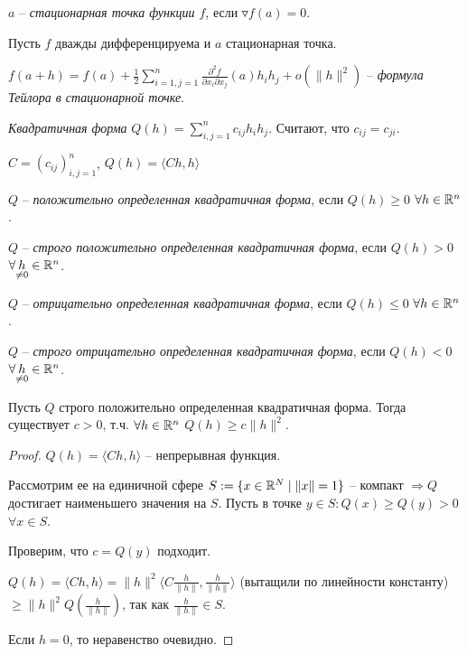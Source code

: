 \begin{definition}
    $a$ – \textit{стационарная точка функции $f$}, если $\triangledown f(a)=0$.
\end{definition}

\begin{remark}
    Пусть $f$ дважды дифференцируема и $a$ стационарная точка.

    $f(a + h)=f(a)+\frac{1}{2}\sum\limits_{i=1, j=1}^n\frac{\partial^2 f}{\partial x_i \partial x_j}(a) h_i h_j+o(\|h\|^2)$ – \textit{формула Тейлора в стационарной точке}.
\end{remark}

\begin{definition}
    \textit{Квадратичная форма} $Q(h)=\sum\limits_{i, j=1}^n c_{ij}h_ih_j$. Считают, что $c_{ij}=c_{ji}$.

    $C= (c_{ij})^n_{i, j=1}$, $Q(h)=\langle Ch, h\rangle$
\end{definition}

\begin{definition}
    $Q$ – \textit{положительно определенная квадратичная форма}, если $Q(h)\geq 0$ $\forall h\in \mathbb{R}^n$.

    $Q$ – \textit{строго положительно определенная квадратичная форма}, если $Q(h)> 0$ $\forall \underset{\neq 0}{h}\in \mathbb{R}^n$.
\end{definition}

\begin{definition}
    $Q$ – \textit{отрицательно определенная квадратичная форма}, если $Q(h)\leq 0$ $\forall h\in \mathbb{R}^n$.

    $Q$ – \textit{строго отрицательно определенная квадратичная форма}, если $Q(h)< 0$ $\forall \underset{\neq 0}{h}\in \mathbb{R}^n$.
\end{definition}

\begin{lemma}
    Пусть $Q$ строго положительно определенная квадратичная форма. Тогда существует $c>0$, т.ч. $ \forall h\in \mathbb{R}^n$ $Q(h)\geq c\|h\|^2$.
\end{lemma}
\begin{proof}
    $Q(h)=\langle Ch, h\rangle$ – непрерывная функция. 
    
    
    Рассмотрим ее на единичной сфере $S:=\{x\in \mathbb{R}^N\mid \|x\|=1\}$ – компакт $\Rightarrow Q$ достигает наименьшего значения на $S$. Пусть в точке $y\in S: Q(x)\geq Q(y)>0$ $\forall x\in S$.

    Проверим, что $c=Q(y)$ подходит.

    $Q(h)=\langle Ch, h\rangle= \|h\|^2\langle C\frac{h}{\|h\|}, \frac{h}{\|h\|}\rangle$ (вытащили по линейности константу) $\geq \|h\|^2 Q(\frac{h}{\|h\|})$, так как $\frac{h}{\|h\|}\in S$. 

    Если $h=0$, то неравенство очевидно.
\end{proof}

